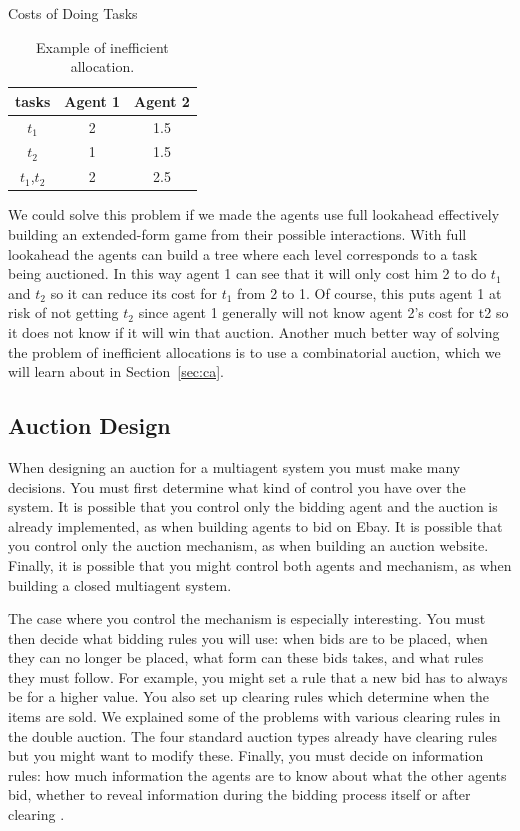 \begin{table}
  \begin{minipage}{1.0\linewidth}
    \begin{center}
      Costs of Doing Tasks
      \begin{tabular}{ccc}\toprule
        tasks&Agent 1&Agent 2\\ \midrule
        $t_1$&2&1.5\\ 
        $t_2$&1&1.5\\ 
        $t_1$,$t_2$&2&2.5\\ \bottomrule
      \end{tabular}
    \end{center}
  \end{minipage}
  \caption{Example of inefficient allocation.}
  \label{tab:inef}
\end{table}

We could solve this problem if we made the agents use full lookahead
effectively building an extended-form game from their possible
interactions. With full lookahead the agents can build a tree where
each level corresponds to a task being auctioned.  In this way agent 1
can see that it will only cost him 2 to do $t_1$ and $t_2$ so it can
reduce its cost for $t_1$ from 2 to 1. Of course, this puts agent 1 at
risk of not getting $t_2$ since agent 1 generally will not know agent
2's cost for t2 so it does not know if it will win that auction.
Another much better way of solving the problem of inefficient
allocations is to use a combinatorial auction, which we will learn
about in Section~\ref{sec:ca}.

\subsection{Auction Design}

When designing an auction for a multiagent system you must make many
decisions. You must first determine what kind of control you have over
the system. It is possible that you control only the bidding agent and
the auction is already implemented, as when building agents to bid on
Ebay. It is possible that you control only the auction mechanism, as
when building an auction website. Finally, it is possible that you
might control both agents and mechanism, as when building a closed
multiagent system.

The case where you control the mechanism is especially interesting.
You must then decide what bidding rules you will use: when bids are to
be placed, when they can no longer be placed, what form can these bids
takes, and what rules they must follow. For example, you might set a
rule that a new bid has to always be for a higher value. You also set
up clearing rules which determine when the items are sold. We
explained some of the problems with various clearing rules in the
double auction. The four standard auction types already have clearing
rules but you might want to modify these. Finally, you must decide on
information rules: how much information the agents are to know about
what the other agents bid, whether to reveal information during the
bidding process itself or after clearing \cite{wurman02a}.

